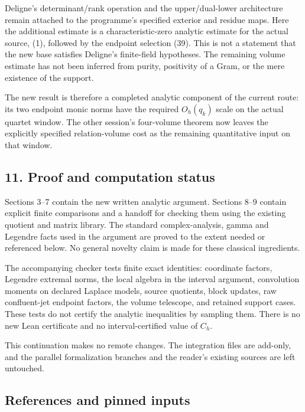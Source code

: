 \documentclass[11pt,a4paper]{article}
\begin{document}
Deligne's determinant/rank operation and the upper/dual-lower architecture remain attached to the programme's specified exterior and residue maps. Here the additional estimate is a characteristic-zero analytic estimate for the actual source, (1), followed by the endpoint selection (39). This is not a statement that the new base satisfies Deligne's finite-field hypotheses. The remaining volume estimate has not been inferred from purity, positivity of a Gram, or the mere existence of the support.

The new result is therefore a completed analytic component of the current route: its two endpoint monic norms have the required \(O_h(q_k)\) scale on the actual quartet window. The other session's four-volume theorem now leaves the explicitly specified relation-volume cost as the remaining quantitative input on that window.

\subsection{11. Proof and computation status}\label{zlm:endpoint-arithmetic_original--proof-and-computation-status}

Sections 3--7 contain the new written analytic argument. Sections 8--9 contain explicit finite comparisons and a handoff for checking them using the existing quotient and matrix library. The standard complex-analysis, gamma and Legendre facts used in the argument are proved to the extent needed or referenced below. No general novelty claim is made for these classical ingredients.

The accompanying checker tests finite exact identities: coordinate factors, Legendre extremal norms, the local algebra in the interval argument, convolution moments on declared Laplace models, source quotients, block updates, raw confluent-jet endpoint factors, the volume telescope, and retained support cases. These tests do not certify the analytic inequalities by sampling them. There is no new Lean certificate and no interval-certified value of \(C_h\).

This continuation makes no remote changes. The integration files are add-only, and the parallel formalization branches and the reader's existing sources are left untouched.

\subsection{References and pinned inputs}\label{zlm:endpoint-arithmetic_original--references-and-pinned-inputs}
\end{document}
